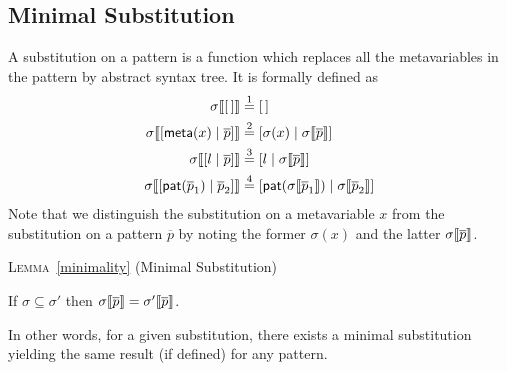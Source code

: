 
\subsection{Minimal Substitution}

A substitution on a pattern is a function which replaces all the
meta\-variables in the pattern by abstract syntax tree. It is
formally defined as
\begin{align*}
  \subst{\el}{\sigma} 
&\eqn{1} \el\\
  \subst{\cons{\cstr{meta}{x}}{\overline{p}}}{\sigma}
&\eqn{2} \cons{\sigma(x)}{\subst{\overline{p}}{\sigma}}\\
  \subst{\cons{l}{\overline{p}}}{\sigma}
&\eqn{3} \cons{l}{\subst{\overline{p}}{\sigma}}\\
  \subst{\cons{\pat{\overline{p}_1}}{\overline{p}_2}}{\sigma}
&\eqn{4}
  \cons{\pat{\subst{\overline{p}_1}{\sigma}}}%
       {\subst{\overline{p}_2}{\sigma}}
\end{align*}
Note that we distinguish the substitution on a meta\-variable
\(x\) from the substitution on a pattern \(\overline{p}\) by noting
the former \(\sigma(x)\) and the latter
\(\subst{\overline{p}}{\sigma}\).

\medskip

\noindent\textsc{Lemma}~\ref{minimality} (Minimal Substitution)\hfill
\label{minimality_proof}
\begin{center}
If \(\sigma \subseteq \sigma'\) 
then \(\subst{\overline{p}}{\sigma} = \subst{\overline{p}}{\sigma'}\).
\end{center}
\noindent In other words, for a given substitution, there exists a
minimal substitution yielding the same result (if defined) for any
pattern.

\medskip

